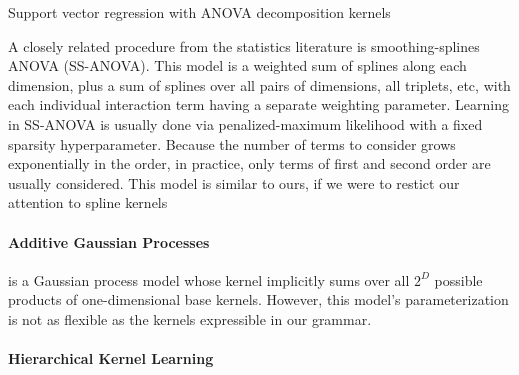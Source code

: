 \documentclass[twoside]{article}
\begin{document}
Support vector regression with ANOVA decomposition kernels \cite{stitson1999support}

A closely related procedure from the statistics literature is smoothing-splines ANOVA (SS-ANOVA)\cite{wahba1990spline, gu2002smoothing}.
This model is a weighted sum of splines along each dimension, plus a sum of splines over all pairs of dimensions, all triplets, etc, with each individual interaction term having a separate weighting parameter.
Learning in SS-ANOVA is usually done via penalized-maximum likelihood with a fixed sparsity hyperparameter.
Because the number of terms to consider grows exponentially in the order, in practice, only terms of first and second order are usually considered.  This model is similar to ours, if we were to restict our attention to spline kernels

\paragraph{Additive Gaussian Processes} \cite{duvenaud2011additive11} is a Gaussian process model whose kernel implicitly sums over all $2^D$ possible products of one-dimensional base kernels.  
However, this model's parameterization is not as flexible as the kernels expressible in our grammar.

\paragraph{Hierarchical Kernel Learning}
\end{document}
